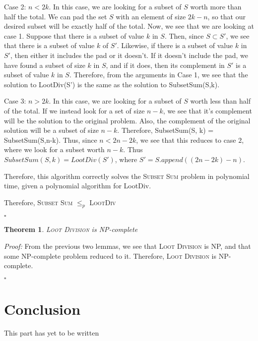 \documentclass{article}
\newtheorem{theorem}{Theorem}[section]
\begin{document}
Case 2: $n < 2k$.  In this case, we are looking for a subset of $S$ worth more than half the total.  We can pad the set $S$ with an element of size $2k - n$, so that our desired subset will be exactly half of the total.  Now, we see that we are looking at case 1.  Suppose that there is a subset of value $k$ in $S$.  Then, since $S \subset S'$, we see that there is a subset of value $k$ of $S'$.  Likewise, if there is a subset of value $k$ in $S'$, then either it includes the pad or it doesn't.  If it doesn't include the pad, we have found a subset of size $k$ in $S$, and if it does, then its complement in $S'$ is a subset of value $k$ in $S$.  Therefore, from the arguments in Case 1, we see that the solution to LootDiv(S') is the same as the solution to SubsetSum(S,k).

Case 3: $n > 2k$.  In this case, we are looking for a subset of $S$ worth less than half of the total.  If we instead look for a set of size $n - k$, we see that it's complement will be the solution to the original problem.  Also, the complement of the original solution will be a subset of size $n-k$.  Therefore, SubsetSum(S, k) = SubsetSum(S,n-k).  Thus, since $n < 2n - 2k$, we see that this reduces to case $2$, where we look for a subset worth $n-k$.  Thus $SubsetSum(S, k) = LootDiv(S')$, where $S' = S.append((2n - 2k) - n)$.

Therefore, this algorithm correctly solves the \textsc{Subset Sum} problem in polynomial time, given a polynomial algorithm for LootDiv.  

Therefore, \textsc{Subset Sum} $\leq_p$  \textsc{LootDiv} 

\begin{flushright}
$\square$
\end{flushright}

\begin{theorem}
\textsc{Loot Division} is NP-complete
\end{theorem}

\textit{Proof:}  From the previous two lemmas, we see that \textsc{Loot Division} is NP, and that some NP-complete problem reduced to it.  Therefore, \textsc{Loot Division} is NP-complete.

\begin{flushright}
$\square$
\end{flushright}

\section{Conclusion}

This part has yet to be written
\end{document}
